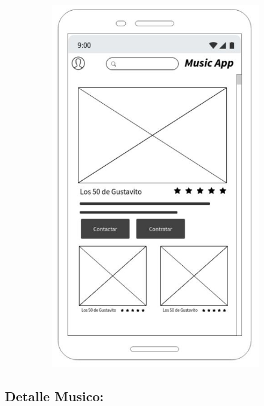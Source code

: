 \begin{figure}[hbt!]
 \centering
\includegraphics[width=12cm, height=16cm,keepaspectratio=true]{Desarrollo/Interfaces/Mockup/imgs/wire3.JPG}
\end{figure}
\newpage
\subsection{Detalle Musico:}

